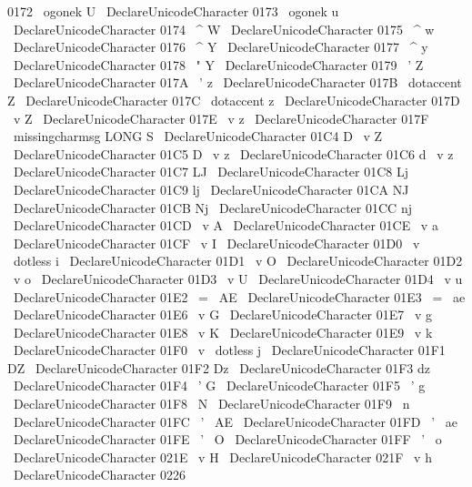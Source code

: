 {{{{{{
0172
}
{
\
ogonek
{
U
}
}
%
\
DeclareUnicodeCharacter
{
0173
}
{
\
ogonek
{
u
}
}
%
\
DeclareUnicodeCharacter
{
0174
}
{
\
^
W
}
%
\
DeclareUnicodeCharacter
{
0175
}
{
\
^
w
}
%
\
DeclareUnicodeCharacter
{
0176
}
{
\
^
Y
}
%
\
DeclareUnicodeCharacter
{
0177
}
{
\
^
y
}
%
\
DeclareUnicodeCharacter
{
0178
}
{
\
"
Y
}
%
\
DeclareUnicodeCharacter
{
0179
}
{
\
'
Z
}
%
\
DeclareUnicodeCharacter
{
017A
}
{
\
'
z
}
%
\
DeclareUnicodeCharacter
{
017B
}
{
\
dotaccent
{
Z
}
}
%
\
DeclareUnicodeCharacter
{
017C
}
{
\
dotaccent
{
z
}
}
%
\
DeclareUnicodeCharacter
{
017D
}
{
\
v
{
Z
}
}
%
\
DeclareUnicodeCharacter
{
017E
}
{
\
v
{
z
}
}
%
\
DeclareUnicodeCharacter
{
017F
}
{
\
missingcharmsg
{
LONG
S
}
}
%
%
\
DeclareUnicodeCharacter
{
01C4
}
{
D
\
v
{
Z
}
}
%
\
DeclareUnicodeCharacter
{
01C5
}
{
D
\
v
{
z
}
}
%
\
DeclareUnicodeCharacter
{
01C6
}
{
d
\
v
{
z
}
}
%
\
DeclareUnicodeCharacter
{
01C7
}
{
LJ
}
%
\
DeclareUnicodeCharacter
{
01C8
}
{
Lj
}
%
\
DeclareUnicodeCharacter
{
01C9
}
{
lj
}
%
\
DeclareUnicodeCharacter
{
01CA
}
{
NJ
}
%
\
DeclareUnicodeCharacter
{
01CB
}
{
Nj
}
%
\
DeclareUnicodeCharacter
{
01CC
}
{
nj
}
%
\
DeclareUnicodeCharacter
{
01CD
}
{
\
v
{
A
}
}
%
\
DeclareUnicodeCharacter
{
01CE
}
{
\
v
{
a
}
}
%
\
DeclareUnicodeCharacter
{
01CF
}
{
\
v
{
I
}
}
%
%
\
DeclareUnicodeCharacter
{
01D0
}
{
\
v
{
\
dotless
{
i
}
}
}
%
\
DeclareUnicodeCharacter
{
01D1
}
{
\
v
{
O
}
}
%
\
DeclareUnicodeCharacter
{
01D2
}
{
\
v
{
o
}
}
%
\
DeclareUnicodeCharacter
{
01D3
}
{
\
v
{
U
}
}
%
\
DeclareUnicodeCharacter
{
01D4
}
{
\
v
{
u
}
}
%
%
\
DeclareUnicodeCharacter
{
01E2
}
{
\
=
{
\
AE
}
}
%
\
DeclareUnicodeCharacter
{
01E3
}
{
\
=
{
\
ae
}
}
%
\
DeclareUnicodeCharacter
{
01E6
}
{
\
v
{
G
}
}
%
\
DeclareUnicodeCharacter
{
01E7
}
{
\
v
{
g
}
}
%
\
DeclareUnicodeCharacter
{
01E8
}
{
\
v
{
K
}
}
%
\
DeclareUnicodeCharacter
{
01E9
}
{
\
v
{
k
}
}
%
%
\
DeclareUnicodeCharacter
{
01F0
}
{
\
v
{
\
dotless
{
j
}
}
}
%
\
DeclareUnicodeCharacter
{
01F1
}
{
DZ
}
%
\
DeclareUnicodeCharacter
{
01F2
}
{
Dz
}
%
\
DeclareUnicodeCharacter
{
01F3
}
{
dz
}
%
\
DeclareUnicodeCharacter
{
01F4
}
{
\
'
G
}
%
\
DeclareUnicodeCharacter
{
01F5
}
{
\
'
g
}
%
\
DeclareUnicodeCharacter
{
01F8
}
{
\
N
}
%
\
DeclareUnicodeCharacter
{
01F9
}
{
\
n
}
%
\
DeclareUnicodeCharacter
{
01FC
}
{
\
'
{
\
AE
}
}
%
\
DeclareUnicodeCharacter
{
01FD
}
{
\
'
{
\
ae
}
}
%
\
DeclareUnicodeCharacter
{
01FE
}
{
\
'
{
\
O
}
}
%
\
DeclareUnicodeCharacter
{
01FF
}
{
\
'
{
\
o
}
}
%
%
\
DeclareUnicodeCharacter
{
021E
}
{
\
v
{
H
}
}
%
\
DeclareUnicodeCharacter
{
021F
}
{
\
v
{
h
}
}
%
%
\
DeclareUnicodeCharacter
{
0226
}}}}}}
